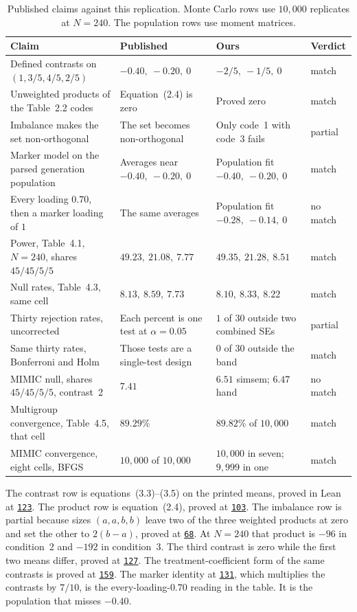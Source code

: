 \documentclass[11pt]{article}
\newcommand{\proofbase}{https://github.com/alectionary/vibe-math/blob/master/formalization/latent-contrasts}
\newcommand{\lean}[2]{\href{\proofbase/LatentContrasts/Orthogonality.lean\#L#2}{\texttt{#2}}}
\begin{document}
\begin{table}[ht]
\centering
\small
\begin{tabular}{@{}p{}p{}p{}p{}@{}}
\toprule
Claim & Published & Ours & Verdict \\
\midrule
Defined contrasts on \((1, 3/5, 4/5, 2/5)\) &
\(-0.40,\ -0.20,\ 0\) &
\(-2/5,\ -1/5,\ 0\) &
match \\
Unweighted products of the Table~2.2 codes &
Equation~(2.4) is zero &
Proved zero &
match \\
Imbalance makes the set non-orthogonal &
The set becomes non-orthogonal &
Only code~1 with code~3 fails &
partial \\
Marker model on the parsed generation population &
Averages near \(-0.40,\ -0.20,\ 0\) &
Population fit \(-0.40,\ -0.20,\ 0\) &
match \\
Every loading \(0.70\), then a marker loading of \(1\) &
The same averages &
Population fit \(-0.28,\ -0.14,\ 0\) &
no match \\
Power, Table~4.1, \(N=240\), shares \(45/45/5/5\) &
\(49.23,\ 21.08,\ 7.77\) &
\(49.35,\ 21.28,\ 8.51\) &
match \\
Null rates, Table~4.3, same cell &
\(8.13,\ 8.59,\ 7.73\) &
\(8.10,\ 8.33,\ 8.22\) &
match \\
Thirty rejection rates, uncorrected &
Each percent is one test at \(\alpha=0.05\) &
\(1\) of \(30\) outside two combined SEs &
partial \\
Same thirty rates, Bonferroni and Holm &
Those tests are a single-test design &
\(0\) of \(30\) outside the band &
match \\
MIMIC null, shares \(45/45/5/5\), contrast~2 &
\(7.41\) &
\(6.51\) simsem; \(6.47\) hand &
no match \\
Multigroup convergence, Table~4.5, that cell &
\(89.29\%\) &
\(89.82\%\) of \(10{,}000\) &
match \\
MIMIC convergence, eight cells, BFGS &
\(10{,}000\) of \(10{,}000\) &
\(10{,}000\) in seven; \(9{,}999\) in one &
match \\
\bottomrule
\end{tabular}
\caption{Published claims against this replication. Monte Carlo rows use
\(10{,}000\) replicates at \(N=240\). The population rows use moment
matrices.}
\label{tab:compare}
\end{table}

The contrast row is equations~(3.3)--(3.5) on the printed means, proved
in Lean~\cite{demoura2021} at \lean{}{123}. The product row is equation~(2.4), proved at
\lean{}{103}. The imbalance row is partial because sizes \((a,a,b,b)\)
leave two of the three weighted products at zero and set the other to
\(2(b-a)\), proved at \lean{}{68}. At \(N=240\) that product is \(-96\)
in condition~2 and \(-192\) in condition~3. The third contrast is zero
while the first two means differ, proved at \lean{}{127}.
The treatment-coefficient form of the same contrasts is proved at
\lean{}{159}. The marker identity at \lean{}{131}, which multiplies the
contrasts by \(7/10\), is the every-loading-\(0.70\) reading in the
table. It is the population that misses \(-0.40\).
\end{document}
